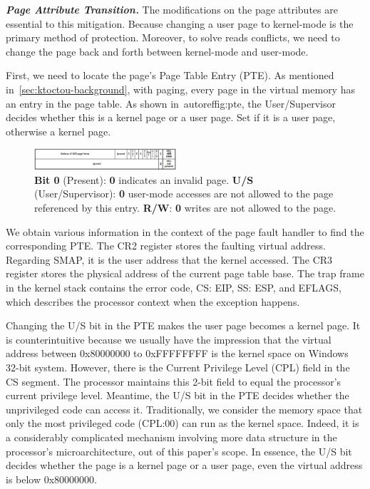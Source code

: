 \textbf{\textit{Page Attribute Transition.}}  The modifications on the page attributes are essential to this mitigation. Because changing a user page to kernel-mode is the primary method of protection.  Moreover, to solve reads conflicts, we need to change the page back and forth between kernel-mode and user-mode. 

First, we need to locate the page's Page Table Entry (PTE). As mentioned in~\autoref{sec:ktoctou-background}, with paging, every page in the virtual memory has an entry in the page table.  As shown in~autoref{fig:pte}, the User/Supervisor decides whether this is a kernel page or a user page. Set if it is a user page, otherwise a kernel page.


\begin{figure}[th]
  \includegraphics[width=0.47\textwidth]{figures/pte2}
  \centering
  \caption{\textbf{Bit 0} (Present): \textbf{0} indicates an invalid page. \textbf{U/S} (User/Supervisor): \textbf{0} user-mode accesses are not allowed to the page referenced by this entry. \textbf{R/W}: \textbf{0} writes are not allowed to the page.}
  \label{fig:pte}
\end{figure}



We obtain various information in the context of the page fault
handler to find the corresponding PTE. The CR2 register stores the faulting virtual address. Regarding SMAP, it is the user address that the kernel accessed. The CR3 register stores the physical address
of the current page table base. The trap frame in the kernel stack contains the error code, CS: EIP, SS: ESP, and EFLAGS, which describes the processor context when the exception happens.

Changing the U/S bit in the PTE makes the user page becomes a kernel page. It is counterintuitive because we usually have the impression that the virtual address between 0x80000000 to 0xFFFFFFFF is the kernel space on Windows 32-bit system. However, there is the Current Privilege Level (CPL) field in the CS segment. The processor maintains this 2-bit field to equal the processor's current privilege level. Meantime, the U/S bit in the PTE decides whether the unprivileged code can access it. Traditionally, we consider the memory space that only the most privileged code (CPL:00) can run as the kernel space. Indeed, it is a considerably complicated mechanism involving more data structure in the processor's microarchitecture, out of this paper's scope. In essence, the U/S bit decides whether the page is a kernel page or a user page, even the virtual address is below 0x80000000.



